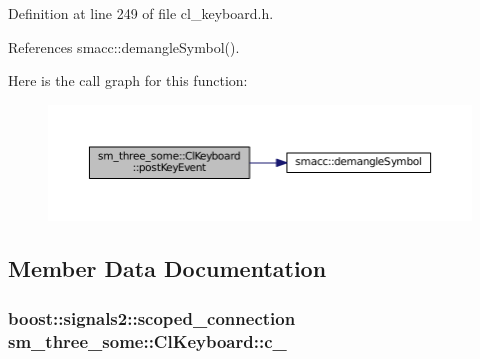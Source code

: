 Definition at line 249 of file cl\+\_\+keyboard.\+h.



References smacc\+::demangle\+Symbol().




Here is the call graph for this function\+:
\nopagebreak
\begin{figure}[H]
\begin{center}
\leavevmode
\includegraphics[width=350pt]{classsm__three__some_1_1ClKeyboard_a7e632c803df38eba991432752bcf7116_cgraph}
\end{center}
\end{figure}




\subsection{Member Data Documentation}
\subsubsection[{\texorpdfstring{c\+\_\+}{c_}}]{\setlength{\rightskip}{0pt plus 5cm}boost\+::signals2\+::scoped\+\_\+connection sm\+\_\+three\+\_\+some\+::\+Cl\+Keyboard\+::c\+\_\+}\hypertarget{classsm__three__some_1_1ClKeyboard_a6e57fd1ed7509656887b8e939b90178c}{}\label{classsm__three__some_1_1ClKeyboard_a6e57fd1ed7509656887b8e939b90178c}


